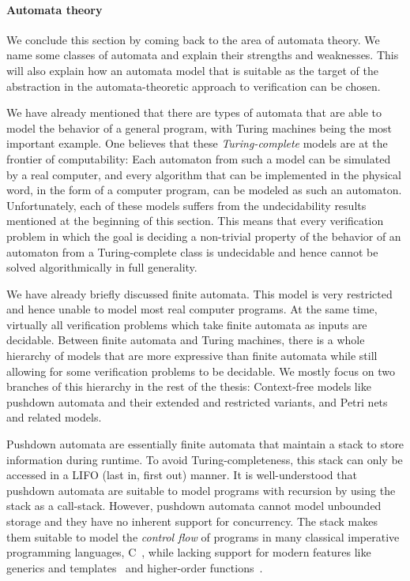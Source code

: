 \documentclass[../../diss.tex]{subfiles}
\begin{document}
\paragraph{Automata theory}

We conclude this section by coming back to the area of automata theory.
We name some classes of automata and explain their strengths and weaknesses.
This will also explain how an automata model that is suitable as the target of the abstraction in the automata-theoretic approach to verification can be chosen.

We have already mentioned that there are types of automata that are able to model the behavior of a general program, with Turing machines being the most important example.
One believes that these \emph{Turing-complete} models are at the frontier of computability: Each automaton from such a model can be simulated by a real computer, and every algorithm that can be implemented in the physical word, \eg in the form of a computer program, can be modeled as such an automaton.
Unfortunately, each of these models suffers from the undecidability results mentioned at the beginning of this section.
This means that every verification problem in which the goal is deciding a non-trivial property of the behavior of an automaton from a Turing-complete class is undecidable and hence cannot be solved algorithmically in full generality.

We have already briefly discussed finite automata.
This model is very restricted and hence unable to model most real computer programs.
At the same time, virtually all verification problems which take finite automata as inputs are decidable.
Between finite automata and Turing machines, there is a whole hierarchy of models that are more expressive than finite automata while still allowing for some verification problems to be decidable.
We mostly focus on two branches of this hierarchy in the rest of the thesis:
Context-free models like pushdown automata and their extended and restricted variants, and Petri nets and related models.

Pushdown automata are essentially finite automata that maintain a stack to store information during runtime.
To avoid Turing-completeness, this stack can only be accessed in a LIFO (last in, first out) manner.
It is well-understood that pushdown automata are suitable to model programs with recursion by using the stack as a call-stack.
However, pushdown automata cannot model unbounded storage and they have no inherent support for concurrency.
The stack makes them suitable to model the \emph{control flow} of programs in many classical imperative programming languages, \eg C~\cite{C90}, while lacking support for modern features like generics and templates~\cite{Alexandrescu01} and higher-order functions~\cite{Haskell03}.
\end{document}
